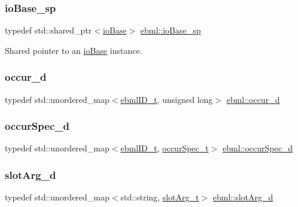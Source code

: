 \mbox{\label{namespaceebml_a7bb59128ac6af27e47367938a846b569}} 
\subsubsection{\texorpdfstring{io\+Base\+\_\+sp}{ioBase\_sp}}
{\footnotesize\ttfamily typedef std\+::shared\+\_\+ptr$<$\mbox{\hyperlink{classebml_1_1ioBase}{io\+Base}}$>$ \mbox{\hyperlink{namespaceebml_a7bb59128ac6af27e47367938a846b569}{ebml\+::io\+Base\+\_\+sp}}}

Shared pointer to an \mbox{\hyperlink{classebml_1_1ioBase}{io\+Base}} instance. \mbox{\label{namespaceebml_a4ecb956f78f49ef5e24e0d0db9b646f4}} 
\subsubsection{\texorpdfstring{occur\+\_\+d}{occur\_d}}
{\footnotesize\ttfamily typedef std\+::unordered\+\_\+map$<$\mbox{\hyperlink{namespaceebml_a86c5f604ddf12a74aa9812e997a58691}{ebml\+I\+D\+\_\+t}}, unsigned long$>$ \mbox{\hyperlink{namespaceebml_a4ecb956f78f49ef5e24e0d0db9b646f4}{ebml\+::occur\+\_\+d}}}

\mbox{\label{namespaceebml_a1cd7dafb7e8e8975fecc4a11ef03c5be}} 
\subsubsection{\texorpdfstring{occur\+Spec\+\_\+d}{occurSpec\_d}}
{\footnotesize\ttfamily typedef std\+::unordered\+\_\+map$<$\mbox{\hyperlink{namespaceebml_a86c5f604ddf12a74aa9812e997a58691}{ebml\+I\+D\+\_\+t}}, \mbox{\hyperlink{structebml_1_1occurSpec__t}{occur\+Spec\+\_\+t}}$>$ \mbox{\hyperlink{namespaceebml_a1cd7dafb7e8e8975fecc4a11ef03c5be}{ebml\+::occur\+Spec\+\_\+d}}}

\mbox{\label{namespaceebml_a4317d4c495715eced3ed448c2d05caeb}} 
\subsubsection{\texorpdfstring{slot\+Arg\+\_\+d}{slotArg\_d}}
{\footnotesize\ttfamily typedef std\+::unordered\+\_\+map$<$std\+::string, \mbox{\hyperlink{classebml_1_1slotArg__t}{slot\+Arg\+\_\+t}}$>$ \mbox{\hyperlink{namespaceebml_a4317d4c495715eced3ed448c2d05caeb}{ebml\+::slot\+Arg\+\_\+d}}}

